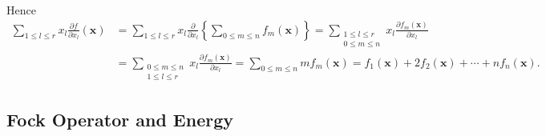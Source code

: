 \documentclass[aps,preprint]{revtex4}%
\begin{document}
Hence%
\begin{align}%
{\textstyle\sum\limits_{1\leq l\leq r}}
x_{l}\frac{\partial f}{\partial x_{l}}\left(  \mathbf{x}\right)   &  =%
{\textstyle\sum\limits_{1\leq l\leq r}}
x_{l}\frac{\partial}{\partial x_{l}}\left\{
{\textstyle\sum\limits_{0\leq m\leq n}}
f_{m}\left(  \mathbf{x}\right)  \right\}  =%
{\textstyle\sum\limits_{\substack{1\leq l\leq r\\0\leq m\leq n}}}
x_{l}\frac{\partial f_{m}\left(  \mathbf{x}\right)  }{\partial x_{l}%
}\nonumber\\
&  =%
{\textstyle\sum\limits_{\substack{0\leq m\leq n\\1\leq l\leq r}}}
x_{l}\frac{\partial f_{m}\left(  \mathbf{x}\right)  }{\partial x_{l}}=%
{\textstyle\sum\limits_{0\leq m\leq n}}
mf_{m}\left(  \mathbf{x}\right)  =f_{1}\left(  \mathbf{x}\right)
+2f_{2}\left(  \mathbf{x}\right)  +\cdots+nf_{n}\left(  \mathbf{x}\right)  .
\label{homex}%
\end{align}


\subsection{Fock Operator and Energy\label{Fock&En}}
\end{document}
